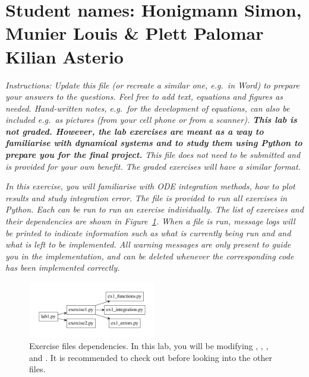 \documentclass{cmc}
\begin{document}
\pagestyle{fancy}
 

\section*{Student names: Honigmann Simon, Munier Louis \& Plett Palomar Kilian Asterio}

\textit{Instructions: Update this file (or recreate a similar one, e.g.\ in
  Word) to prepare your answers to the questions. Feel free to add text,
  equations and figures as needed. Hand-written notes, e.g.\ for the development
  of equations, can also be included e.g.\ as pictures (from your cell phone or
  from a scanner).  \textbf{This lab is not graded. However, the lab exercises
    are meant as a way to familiarise with dynamical systems and to study them
    using Python to prepare you for the final project.} This file does not need
  to be submitted and is provided for your own benefit. The graded exercises
  will have a similar format.}

\textit{In this exercise, you will familiarise with ODE integration methods, how
  to plot results and study integration error. The file  is
  provided to run all exercises in Python. Each  can be
  run to run an exercise individually. The list of exercises and their
  dependencies are shown in Figure~\ref{fig:files}. When a file is run, message
  logs will be printed to indicate information such as what is currently being
  run and and what is left to be implemented. All warning messages are only
  present to guide you in the implementation, and can be deleted whenever the
  corresponding code has been implemented correctly.}

\begin{figure}[ht]
  	\centering \includegraphics[width=0.5\textwidth]{figures/files}
  	\caption{\label{fig:files} Exercise files dependencies. In this lab, you will
    be modifying , ,
    , and
    . It is recommended to check out
     before looking into the other 
    files.}
\end{figure}
\end{document}
